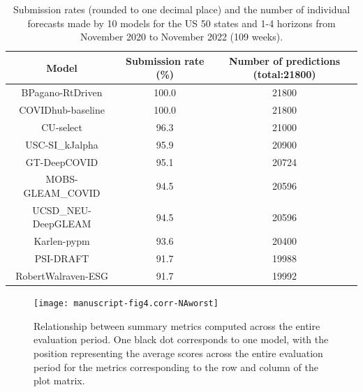 \documentclass{article}
\theoremstyle{definition}
\begin{document}
\begin{table}[ht]
\centering
\begin{tabular}{|ccc|}
  \hline
Model & Submission rate (\%) & Number of predictions (total:21800) \\ 
  \hline
BPagano-RtDriven & 100.0 & 21800 \\ 
  COVIDhub-baseline & 100.0 & 21800 \\ 
  CU-select & 96.3 & 21000 \\ 
  USC-SI\_kJalpha & 95.9 & 20900 \\ 
  GT-DeepCOVID & 95.1 & 20724 \\ 
  MOBS-GLEAM\_COVID & 94.5 & 20596 \\ 
  UCSD\_NEU-DeepGLEAM & 94.5 & 20596 \\ 
  Karlen-pypm & 93.6 & 20400 \\ 
  PSI-DRAFT & 91.7 & 19988 \\ 
  RobertWalraven-ESG & 91.7 & 19992 \\ 
   \hline
\end{tabular}
\caption{Submission rates (rounded to one decimal place) and the number of individual forecasts made by 10 models for the US 50 states and 1-4 horizons from November 2020 to November 2022 (109 weeks).} 
\end{table}


\begin{figure}[h!]
\centering
\texttt{[image: manuscript-fig4.corr-NAworst]}

\caption{Relationship between summary metrics computed across the entire evaluation period. One black dot corresponds to one model, with the position representing the average scores across the entire evaluation period for the metrics corresponding to the row and column of the plot matrix.}
\label{fig:corr-NAworst} 
\end{figure}
\end{document}
